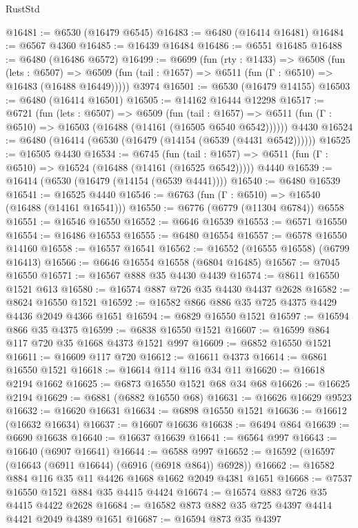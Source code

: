 \begin{lexlean}{RustStd}
\begin{coremodule}
@16481 := @6530 (@16479 @6545)
@16483 := @6480 (@16414 @16481)
@16484 := @6567 @4360
@16485 := @16439 @16484
@16486 := @6551 @16485
@16488 := @6480 (@16486 @6572)
@16499 := @6699
    (fun (rty : @1433) =>
    @6508
      (fun (lets : @6507) =>
      @6509 (fun (tail : @1657) => @6511 (fun (Γ : @6510) => @16483 (@16488 @16449)))))
    @3974
@16501 := @6530 (@16479 @14155)
@16503 := @6480 (@16414 @16501)
@16505 := @14162 @16444 @12298
@16517 := @6721
    (fun (lets : @6507) =>
    @6509
      (fun (tail : @1657) =>
      @6511 (fun (Γ : @6510) => @16503 (@16488 (@14161 (@16505 @6540 @6542))))))
    @4430
@16524 := @6480 (@16414 (@6530 (@16479 (@14154 (@6539 (@4431 @6542))))))
@16525 := @16505 @4430
@16534 := @6745
    (fun (tail : @1657) => @6511 (fun (Γ : @6510) => @16524 (@16488 (@14161 (@16525 @6542)))))
    @4440
@16539 := @16414 (@6530 (@16479 (@14154 (@6539 @4441))))
@16540 := @6480 @16539
@16541 := @16525 @4440
@16546 := @6763 (fun (Γ : @6510) => @16540 (@16488 (@14161 @16541)))
@16550 := @6776 (@6779 (@11304 @6784)) @6558
@16551 := @16546 @16550
@16552 := @6646 @16539
@16553 := @6571 @16550
@16554 := @16486 @16553
@16555 := @6480 @16554
@16557 := @6578 @16550 @14160
@16558 := @16557 @16541
@16562 := @16552 (@16555 @16558) (@6799 @16413)
@16566 := @6646 @16554 @16558 (@6804 @16485)
@16567 := @7045 @16550
@16571 := @16567 @888 @35 @4430 @4439
@16574 := @8611 @16550 @1521 @613
@16580 := @16574 @887 @726 @35 @4430 @4437 @2628
@16582 := @8624 @16550 @1521
@16592 := @16582 @866 @886 @35 @725 @4375 @4429 @4436 @2049 @4366 @1651
@16594 := @6829 @16550 @1521
@16597 := @16594 @866 @35 @4375
@16599 := @6838 @16550 @1521
@16607 := @16599 @864 @117 @720 @35 @1668 @4373 @1521 @997
@16609 := @6852 @16550 @1521
@16611 := @16609 @117 @720
@16612 := @16611 @4373
@16614 := @6861 @16550 @1521
@16618 := @16614 @114 @116 @34 @11
@16620 := @16618 @2194 @1662
@16625 := @6873 @16550 @1521 @68 @34 @68
@16626 := @16625 @2194
@16629 := @6881 (@6882 @16550 @68)
@16631 := @16626 @16629 @9523
@16632 := @16620 @16631
@16634 := @6898 @16550 @1521
@16636 := @16612 (@16632 @16634)
@16637 := @16607 @16636
@16638 := @6494 @864
@16639 := @6690 @16638
@16640 := @16637 @16639
@16641 := @6564 @997
@16643 := @16640 (@6907 @16641)
@16644 := @6588 @997
@16652 := @16592 (@16597 (@16643 (@6911 @16644) (@6916 (@6918 @864)) @6928))
@16662 := @16582 @884 @116 @35 @11 @4426 @1668 @1662 @2049 @4381 @1651
@16668 := @7537 @16550 @1521 @884 @35 @4415 @4424
@16674 := @16574 @883 @726 @35 @4415 @4422 @2628
@16684 := @16582 @873 @882 @35 @725 @4397 @4414 @4421 @2049 @4389 @1651
@16687 := @16594 @873 @35 @4397

\end{coremodule}
\end{lexlean}
